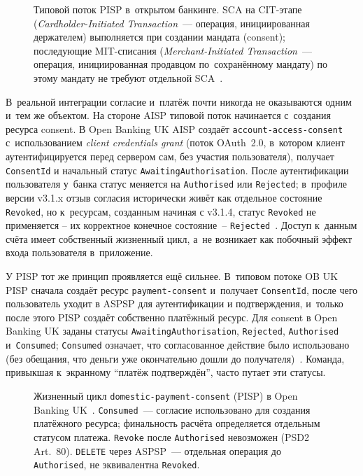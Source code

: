 \begin{figure}[tbp]
  \centering
  \caption{Типовой поток PISP в~открытом банкинге. SCA на CIT-этапе
  (\textit{Cardholder-Initiated Transaction}~--- операция, инициированная
  держателем) выполняется при создании мандата (consent); последующие
  MIT-списания (\textit{Merchant-Initiated Transaction}~--- операция,
  инициированная продавцом по~сохранённому мандату) по этому мандату
  не требуют отдельной SCA~\cite{eba-qa-2018-4031}.}\label{fig:pisp-flow}
\end{figure}

В~реальной интеграции согласие и~платёж почти никогда
не оказываются одним и~тем же объектом. На стороне AISP типовой поток начинается с~создания
ресурса consent. В Open Banking UK AISP создаёт
\texttt{account-access-consent} с~использованием \textit{client
credentials grant} (поток OAuth~2.0, в~котором клиент аутентифицируется
перед сервером сам, без участия пользователя), получает
\texttt{ConsentId} и начальный статус
\texttt{AwaitingAuthorisation}. После аутентификации пользователя
у~банка статус меняется на \texttt{Authorised} или \texttt{Rejected};
в~профиле версии v3.1.x отзыв согласия исторически живёт как
отдельное состояние \texttt{Revoked}, но к~ресурсам, созданным
начиная с v3.1.4, статус \texttt{Revoked} не применяется --
их корректное конечное состояние~--
\texttt{Rejected}~\cite{openbanking-uk-account-access-consents}.
Доступ к~данным счёта имеет собственный жизненный цикл, а~не
возникает как побочный эффект входа пользователя в~приложение.

У PISP тот же принцип проявляется ещё сильнее. В~типовом потоке OB UK
PISP сначала создаёт ресурс \texttt{payment-consent} и~получает
\texttt{ConsentId}, после чего пользователь уходит в ASPSP для
аутентификации и подтверждения, и~только после этого PISP создаёт
собственно платёжный ресурс. Для consent в Open Banking UK заданы
статусы \texttt{AwaitingAuthorisation}, \texttt{Rejected},
\texttt{Authorised} и~\texttt{Consumed}; \texttt{Consumed} означает,
что согласованное действие было использовано (без обещания, что
деньги уже окончательно дошли до
получателя)~\cite{openbanking-uk-payment-initiation-profile,openbanking-uk-domestic-payment-consents}.
Команда, привыкшая к~экранному \enquote{платёж подтверждён}, часто
путает эти статусы.

\begin{figure}[tbp]
  \centering
  \caption{Жизненный цикл \texttt{domestic-payment-consent} (PISP)
  в Open Banking UK~\cite{ob-uk-pi-3110}. \texttt{Consumed}~--- согласие
  использовано для создания платёжного ресурса; финальность расчёта
  определяется отдельным статусом платежа. \texttt{Revoke} после
  \texttt{Authorised} невозможен (PSD2 Art.~80). \texttt{DELETE} через
  ASPSP~--- отдельная операция до \texttt{Authorised}, не эквивалентна
  \texttt{Revoked}.}\label{fig:consent-lifecycle}
\end{figure}

